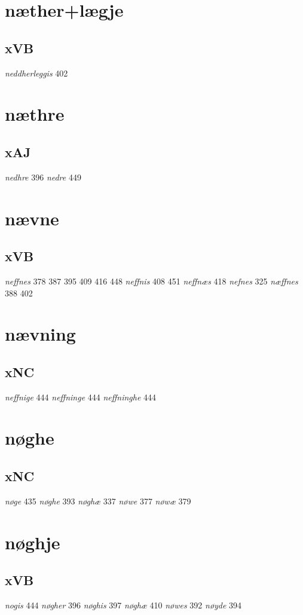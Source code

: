\documentclass[a4paper,twocolumn]{article}
\begin{document}
\section{næther+lægje}
\label{sec:orgbfee3b7}
\subsection{xVB}
\label{sec:org8250c50}
\emph{neddherleggis} 402 
\section{næthre}
\label{sec:orgfcc83db}
\subsection{xAJ}
\label{sec:orge141370}
\emph{nedhre} 396 \emph{nedre} 449 
\section{nævne}
\label{sec:orga9da15f}
\subsection{xVB}
\label{sec:org4033d86}
\emph{neffnes} 378 387 395 409 416 448 \emph{neffnis} 408 451 \emph{neffnæs} 418 \emph{nefnes} 325 \emph{næffnes} 388 402 
\section{nævning}
\label{sec:orgda10e74}
\subsection{xNC}
\label{sec:org0f2e5f3}
\emph{neffnige} 444 \emph{neffninge} 444 \emph{neffninghe} 444 
\section{nøghe}
\label{sec:orge7ae782}
\subsection{xNC}
\label{sec:org968abdc}
\emph{nøge} 435 \emph{nøghe} 393 \emph{nøghæ} 337 \emph{nøwe} 377 \emph{nøwæ} 379 
\section{nøghje}
\label{sec:org496f2e4}
\subsection{xVB}
\label{sec:org33e50f1}
\emph{nogis} 444 \emph{nøgher} 396 \emph{nøghis} 397 \emph{nøghæ} 410 \emph{nøwes} 392 \emph{nøyde} 394 
\end{document}
